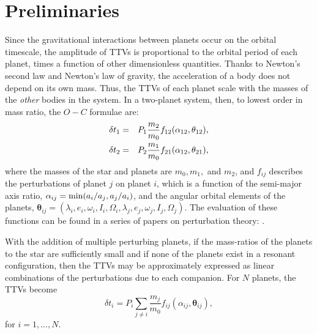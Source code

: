 \documentclass[graybox,natbib,nosecnum]{svmult}
\begin{document}
\section{Preliminaries}

Since the gravitational interactions between planets occur on the orbital timescale, the
amplitude of TTVs is proportional to the orbital period of each planet,
times a function of other dimensionless quantities.  Thanks to Newton's second law
and Newton's law of gravity, the acceleration of a body does not depend on its own mass.
Thus, the TTVs of each planet scale with the masses of the {\it other} bodies
in the system.
In a two-planet system, then, to lowest order in mass ratio, the $O-C$ formulae are: 
\begin{eqnarray}
\delta t_1 &=& P_1 \frac{m_2}{m_0} f_{12}(\alpha_{12},\mathbf{\theta}_{12}),\cr
\delta t_2 &=& P_2 \frac{m_1}{m_0} f_{21}(\alpha_{12},\mathbf{\theta}_{21}),
\end{eqnarray}
where the masses of the star and planets are $m_0, m_1,$ and $m_2$, and $f_{ij}$ describes the perturbations of planet $j$ on planet $i$,
which is a function of the semi-major axis ratio, $\alpha_{ij} = {\rm min}(a_i/a_j,a_j/a_i)$, and the angular orbital 
elements of the planets, $\mathbf{\theta}_{ij} = (\lambda_i,e_i,\omega_i,I_i,\Omega_i,\lambda_j,e_j,\omega_j,I_j,\Omega_j)$.  The evaluation of these functions can be found in a series of papers on perturbation theory: \cite{2008ApJ...688..636N, 2009ApJ...701.1116N,2010ApJ...709L..44N,2016ApJ...818..177A,2016ApJ...821...96D}.

With the addition of multiple perturbing planets, if the mass-ratios of the planets to the star are
sufficiently small and if none of the planets exist in a resonant configuration, then the TTVs may be approximately expressed as linear combinations of the perturbations due to each companion.
For $N$ planets, the TTVs become
\begin{equation}
\delta t_i = P_i \sum_{j \ne i}  \frac{m_j}{m_0} f_{ij}(\alpha_{ij},\mathbf{\theta}_{ij}),
\end{equation}
for $i=1,...,N$.
\end{document}
